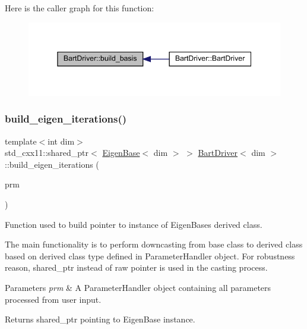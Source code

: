 Here is the caller graph for this function\+:\nopagebreak
\begin{figure}[H]
\begin{center}
\leavevmode
\includegraphics[width=345pt]{class_bart_driver_ade375a4999de1e775434e11d4e6dd935_icgraph}
\end{center}
\end{figure}
\mbox{\label{class_bart_driver_abc542028ef1ab71693acba10bf017018}} 
\subsubsection{\texorpdfstring{build\+\_\+eigen\+\_\+iterations()}{build\_eigen\_iterations()}}
{\footnotesize\ttfamily template$<$int dim$>$ \\
std\+\_\+cxx11\+::shared\+\_\+ptr$<$ \hyperlink{class_eigen_base}{Eigen\+Base}$<$ dim $>$ $>$ \hyperlink{class_bart_driver}{Bart\+Driver}$<$ dim $>$\+::build\+\_\+eigen\+\_\+iterations (\begin{DoxyParamCaption}\item[{const Parameter\+Handler \&}]{prm }\end{DoxyParamCaption})\hspace{0.3cm}{\ttfamily [private]}}



Function used to build pointer to instance of Eigen\+Base\textquotesingle{}s derived class. 

The main functionality is to perform downcasting from base class to derived class based on derived class type defined in Parameter\+Handler object. For robustness reason, shared\+\_\+ptr instead of raw pointer is used in the casting process.


\begin{DoxyParams}{Parameters}
{\em prm} & A Parameter\+Handler object containing all parameters processed from user input. \\
\hline
\end{DoxyParams}
\begin{DoxyReturn}{Returns}
shared\+\_\+ptr pointing to Eigen\+Base instance. 
\end{DoxyReturn}


